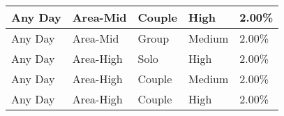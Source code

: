 \begin{longtable}{|l|l|l|l|l|}
    \hline
    Any Day                  & Area-Mid                 & Couple             & High                 & 2.00\%              \\
    \hline
    Any Day                  & Area-Mid                 & Group              & Medium               & 2.00\%              \\
    \hline
    Any Day                  & Area-High                & Solo               & High                 & 2.00\%              \\
    \hline
    Any Day                  & Area-High                & Couple             & Medium               & 2.00\%              \\
    \hline
    Any Day                  & Area-High                & Couple             & High                 & 2.00\%              \\
    \hline
\end{longtable}
\endgroup